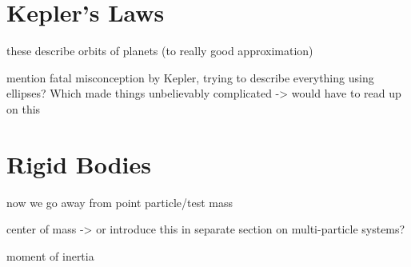 \documentclass[../class_mech_main.tex]{subfiles}
\begin{document}
    \section{Kepler's Laws}

these describe orbits of planets (to really good approximation)


mention fatal misconception by Kepler, trying to describe everything using ellipses? Which made things unbelievably complicated -> would have to read up on this



\newpage



    \section{Rigid Bodies}

now we go away from point particle/test mass


center of mass -> or introduce this in separate section on multi-particle systems?

moment of inertia
\end{document}
